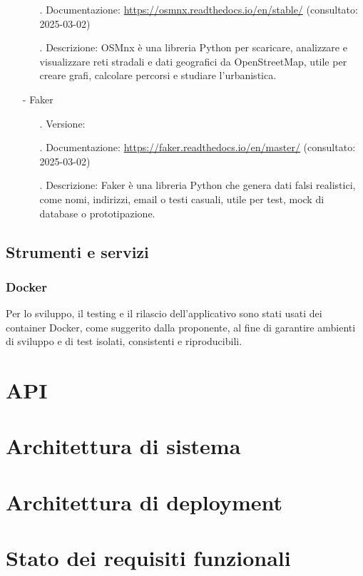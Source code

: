 \documentclass[10pt]{article}
\begin{document}
\begin{justify}
\begin{itemize}
\begin{itemize}
                            \item[.] Documentazione: \url{https://osmnx.readthedocs.io/en/stable/} (consultato: 2025-03-02)
                            \item[.] Descrizione: OSMnx è una libreria Python per scaricare, analizzare e visualizzare reti stradali e dati geografici da OpenStreetMap, 
                            utile per creare grafi, calcolare percorsi e studiare l’urbanistica.
                        \end{itemize}
                    \item[-] Faker
                    \begin{itemize}
                        \item[.] Versione:
                        \item[.] Documentazione: \url{https://faker.readthedocs.io/en/master/} (consultato: 2025-03-02)
                        \item[.] Descrizione: Faker è una libreria Python che genera dati falsi realistici, come nomi, indirizzi, email o testi casuali, utile per test, 
                        mock di database o prototipazione.
                    \end{itemize}
                \end{itemize}


    \subsection{Strumenti e servizi}
        \subsubsection{Docker}
        Per lo sviluppo, il testing e il rilascio dell'applicativo sono stati usati dei container Docker, come suggerito dalla proponente, al fine di garantire ambienti di 
        sviluppo e di test isolati, consistenti e riproducibili.\\



\section{API}


\section{Architettura di sistema}


\section{Architettura di deployment}


\section{Stato dei requisiti funzionali}


\end{justify}
\end{document}
